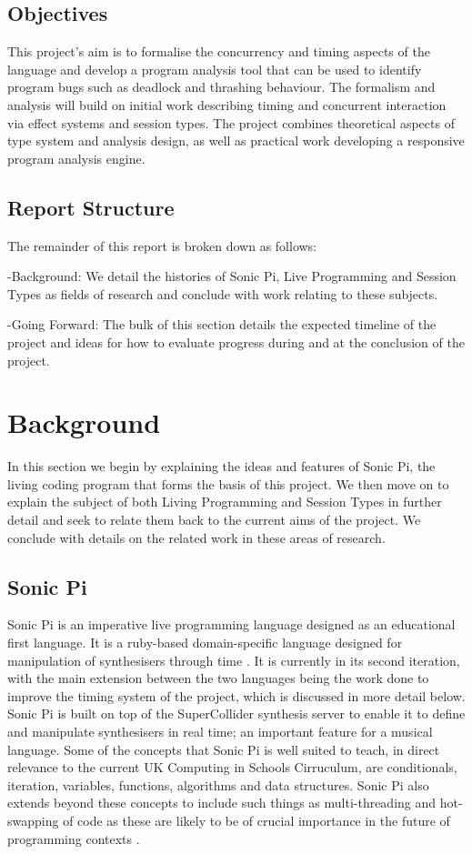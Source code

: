 \documentclass[11pt]{scrartcl}
\begin{document}
\subsection{Objectives}
This project's aim is to formalise the concurrency and timing aspects of the 
language and develop a program analysis tool that can be used to identify 
program bugs such as deadlock and thrashing behaviour. The formalism and 
analysis will build on initial work describing timing and
concurrent interaction via effect systems and session types. The project 
combines theoretical aspects of type system and analysis design, as well as 
practical work developing a responsive program analysis engine.

\subsection{Report Structure}
The remainder of this report is broken down as follows:

-Background: We detail the histories of Sonic Pi, Live Programming and
Session Types as fields of research and conclude with work relating to
these subjects.

-Going Forward: The bulk of this section details the expected timeline of
the project and ideas for how to evaluate progress during and at the
conclusion of the project.

\section{Background}
In this section we begin by explaining the ideas and features of Sonic Pi, 
the living coding program that forms the basis of this project. We then 
move on to explain the subject of both Living Programming and Session Types
in further detail and seek to relate them back to the current aims of the
project. We conclude with details on the related work in these areas of
research.

\subsection{Sonic Pi}
Sonic Pi is an imperative live programming language designed as an educational 
first language. It is a ruby-based domain-specific language designed for 
manipulation of synthesisers through time \cite{AB13}. It is currently in its 
second iteration, with the main extension between the two languages being the 
work done to improve the timing system of the project, which is discussed in 
more detail below. Sonic Pi is built on top of the SuperCollider synthesis 
server to enable it to define and manipulate synthesisers in real time; an 
important feature for a musical language. Some of the concepts that Sonic Pi 
is well suited to teach, in direct relevance to the current UK Computing in 
Schools Cirruculum, are conditionals, iteration, variables, functions, 
algorithms and data structures. Sonic Pi also extends beyond these concepts to 
include such things as multi-threading and hot-swapping of code as these are 
likely to be of crucial importance in the future of programming contexts \cite{
AOB14}.
\end{document}
